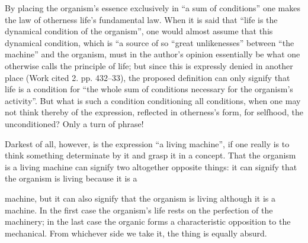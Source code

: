 \documentclass[12pt,a4paper]{book}
\begin{document}
By placing the organism's essence exclusively in ``a sum of conditions'' one makes
the law of otherness life's fundamental law. When it is said that ``life is the
dynamical condition of the organism'', one would almost assume that this dynamical
condition, which is ``a source of so ``great unlikenesses'' between ``the machine''
and the organism, must in the author's opinion essentially be what one otherwise
calls the principle of life; but since this is expressly denied in another place
(Work cited 2. pp. 432--33), the proposed definition can only signify that life is a
condition for ``the whole sum of conditions necessary for the organism's activity''.
But what is such a condition conditioning all conditions, when one may not think
thereby of the expression, reflected in otherness's form, for selfhood, the
unconditioned? Only a turn of phrase!

Darkest of all, however, is the expression ``a living machine'', if one really is to
think something determinate by it and grasp it in a concept. That the organism is a
living machine can signify two altogether opposite things: it can signify that the
organism is living because it is a

\setcounter{footnote}{0}
machine, but it can also signify that the organism is living although it is a
machine. In the first case the organism's life rests on the perfection of the
machinery; in the last case the organic forms a characteristic opposition to the
mechanical. From whichever side we take it, the thing is equally absurd.
\end{document}
